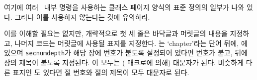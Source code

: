 여기에 여러 \ltx\ 내부 명령을 사용하는  클래스 
페이지 양식의 표준 정의의 일부가 나와 있다.
그러나  이를 사용하지 않는다는 것에 유의하라.
\begin{lcode}
\def\ps@headings{%
  \let\@oddfoot\@empty\let\@evenfoot\@empty
  \def\@evenhead{\thepage\hfil\slshape\leftmark}%
  \def\@oddhead{{\slshape\rightmark}\hfil\thepage}%
  \def\chaptermark##1{%
    \markboth{\MakeUppercase{%
      \ifnum\c@secnumdepth > \m@ne
        \if@mainmatter
          \@chapapp\ \thechapter. \ %
        \fi
      \fi
      ##1}}{}}%
  \def\sectionmark##1{%
    \markright{\MakeUppercase{%
      \ifnum\c@secnumdepth > \z@
        \thesection. \ %
      \fi
      ##1}}}}
\end{lcode}
이를 이해할 필요는 없지만, 개략적으로 첫 세 줄은 바닥글과 머릿글의 내용을
지정하고, 나머지 코드는 머릿글에 사용될 표지를 지정한다.
\cmd{\leftmark}는 `chapter'라는 단어 뒤에, \cmd{\mainmatter}에 있으며
\texttt{secnumdepth}가 해당 장에 번호가 붙도록 설정되어 있다면 번호가 붙고,
뒤에 장의 제목이 붙도록 지정된다.
이 모두는 (\cmd{\MakeUppercase} 매크로에 의해) 대문자가 된다.
비슷하게 다른 표지인 \cmd{\rightmark}도 있다면 절 번호와 절의 제목이 모두
대문자로 된다.

